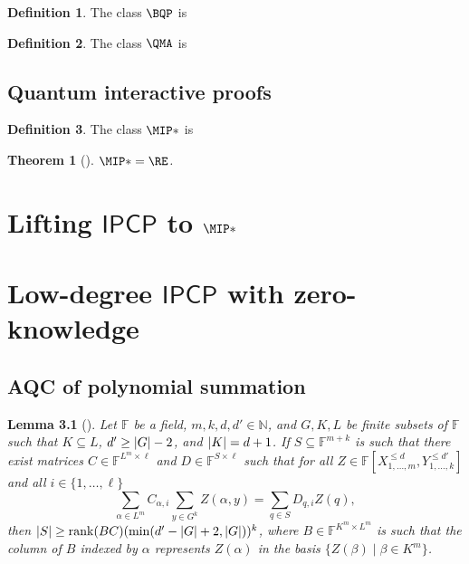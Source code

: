 \documentclass[english]{reedthesis}
\theoremstyle{plain}
\newtheorem{thm}{Theorem}[section]
\newtheorem{lemma}[lemma]{Lemma}
\theoremstyle{definition}
\newtheorem{defn}[defn]{Definition}
\theoremstyle{remark}
\DeclareMathOperator{\rk}{rank}
\DeclarePairedDelimiter{\abs}{\lvert}{\rvert}
\begin{document}
\begin{defn}\label{def:bqp}
  The class $\BQP$ is
\end{defn}

\begin{defn}\label{def:qma}
  The class $\QMA$ is
\end{defn}

\section{Quantum interactive proofs}\label{sec:quant-interactive}

\begin{defn}\label{def:mip-star}
  The class $\MIP*$ is
\end{defn}

\begin{thm}[{\cite{JNVWY21}}]\label{thm:mip-star-is-re}
  $\MIP* = \RE$.
\end{thm}

\chapter{Lifting $\mathsf{IPCP}$ to $\MIP*$}\label{chap:ipcp-to-mip}

\chapter{Low-degree $\mathsf{IPCP}$ with zero-knowledge}\label{chap:ipcp-zero-knowledge}

\section{AQC of polynomial summation}\label{sec:aqc-poly-sum}

\begin{lemma}[{\cite[Lemma 12.1]{CFGS22}}]
  Let $\mathbb{F}$ be a field, $m, k, d, d' \in \mathbb{N}$, and $G, K, L$ be finite
  subsets of $\mathbb{F}$ such that $K \subseteq L$, $d' \ge \abs{G} - 2$, and
  $\abs{K} = d + 1$. If $S \subseteq \mathbb{F}^{m+k}$ is such that there exist matrices
  $C \in \mathbb{F}^{L^{m} \times \ell}$ and $D \in \mathbb{F}^{S \times \ell}$ such that for
  all $Z \in \mathbb{F}[X_{1, \ldots, m}^{\le d}, Y_{1, \ldots, k}^{\le d'}]$ and all
  $i \in \{1, \ldots, \ell\}$
  \begin{equation}
    \sum_{\alpha \in L^{m}}C_{\alpha,i}\sum_{y \in G^{k}}Z(\alpha, y) = \sum_{q \in S}D_{q,i}Z(q),
  \end{equation}
  then $\abs{S} \ge \rk(BC)(\min(d' - \abs{G} + 2, \abs{G}))^{k}$, where
  $B \in \mathbb{F}^{K^{m} \times L^{m}}$ is such that the column of $B$ indexed by $\alpha$
  represents $Z(\alpha)$ in the basis $\{Z(\beta) \mid \beta \in K^{m}\}$.
\end{lemma}
\end{document}
